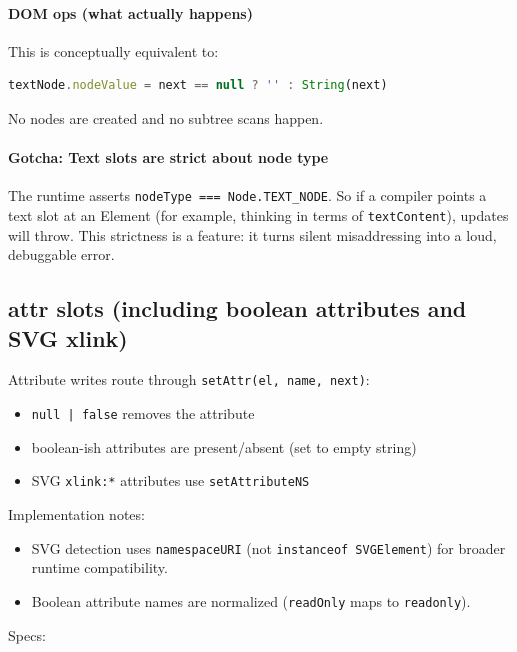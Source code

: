 \paragraph{DOM ops (what actually happens)}

This is conceptually equivalent to:

\begin{lstlisting}[language=JavaScript]
textNode.nodeValue = next == null ? '' : String(next)
\end{lstlisting}

No nodes are created and no subtree scans happen.

\paragraph{Gotcha: Text slots are strict about node type}

The runtime asserts \texttt{nodeType === Node.TEXT\_NODE}.
So if a compiler points a text slot at an Element (for example, thinking in terms of \texttt{textContent}), updates will throw.
This strictness is a feature: it turns silent misaddressing into a loud, debuggable error.

\subsection{attr slots (including boolean attributes and SVG xlink)}

Attribute writes route through \texttt{setAttr(el, name, next)}:

\begin{itemize}
  \item \texttt{null | false} removes the attribute
  \item boolean-ish attributes are present/absent (set to empty string)
  \item SVG \texttt{xlink:*} attributes use \texttt{setAttributeNS}
\end{itemize}

Implementation notes:

\begin{itemize}
  \item SVG detection uses \texttt{namespaceURI} (not \texttt{instanceof SVGElement}) for broader runtime compatibility.
  \item Boolean attribute names are normalized (\texttt{readOnly} maps to \texttt{readonly}).
\end{itemize}

Specs:

